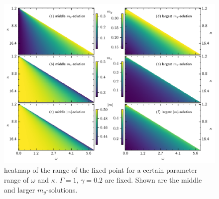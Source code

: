 \documentclass{article}
\begin{document}
\begin{figure}[H]
    \hspace*{-1cm}
    \includegraphics{pictures/fixp_bound_heatmap_ml.png}
    \caption{heatmap of the range of the fixed point for a certain parameter range of $\omega$ and $\kappa$. $\Gamma=1$, $\gamma=0.2$ are fixed. Shown are the middle and larger $m_y$-solutions.}
    \label{fig:fixp_midlarge_bound_hm}
\end{figure}
\end{document}

